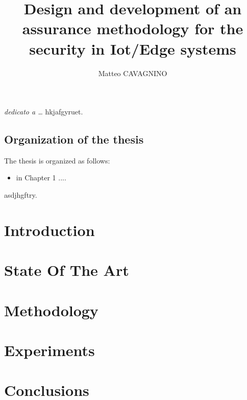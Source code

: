 \documentclass[a4paper,12pt]{report}
\begin{document}
\title{Design and development of an assurance methodology for the security in Iot/Edge systems}
\author{Matteo CAVAGNINO}
%
% 
%
\beforepreface
\prefacesection{}
        {\hfill \Large {\sl dedicato a \dots}}
% 
%
hkjafgyruet.
%
%
\section*{Organization of the thesis}
\label{organizzazione}
The thesis is organized as follows:
\begin{itemize}
\item in Chapter 1 ....
\end{itemize}
%
%
asdjhgftry.
\afterpreface
% 
% 
\chapter{Introduction}
\label{cap1}                        %



\chapter{State Of The Art}
\label{cap2}



\chapter{Methodology}
\label{cap3}

\chapter{Experiments}
\label{cap4}

\chapter{Conclusions}
\label{cap5}





%
%
\begin{thebibliography}{00}



\end{thebibliography}
% 
\end{document}
